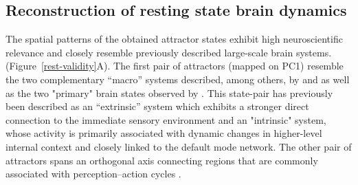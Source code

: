 \documentclass{article}
\begin{document}
\subsection{Reconstruction of resting state brain dynamics}\label{Reconstruction of resting state brain dynamics}

The spatial patterns of the obtained attractor states exhibit high neuroscientific relevance and closely resemble previously described large-scale brain systems. (Figure~\ref{rest-validity}A). The first pair of attractors (mapped on PC1) resemble the two complementary ``macro'' systems described, among others, by \citet{golland2008data} and \citet{cioli2014differences} as well as the two "primary" brain states observed by \citet{chen2018human}. This state-pair has previously been described as an ``extrinsic'' system
which exhibits a stronger direct connection to the immediate sensory environment and an "intrinsic" system, whose
activity is primarily associated with dynamic changes in higher-level internal context and closely linked to the default
mode network. The other pair of attractors spans an orthogonal axis connecting regions that are commonly associated
with perception--action cycles \citep{fuster2004upper}.
\end{document}

